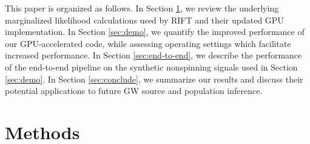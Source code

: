 \documentclass[twocolumn,prd,nofootinbib]{revtex4}
\begin{document}
This paper is organized as follows.
In Section \ref{sec:methods}, we review the underlying marginalized likelihood calculations used by RIFT and  their updated GPU
implementation.  
In Section \ref{sec:demo}, we quantify the improved performance of our  GPU-accelerated code,   while assessing
operating settings which facilitate increased performance.
In Section \ref{sec:end-to-end}, we describe the performance of the end-to-end pipeline on the synthetic nonspinning signals used in
Section \ref{sec:demo}.  
In Section \ref{sec:conclude}, we summarize our results and discuss their potential applications to future GW source and
population inference.


\section{Methods}
\label{sec:methods}
\end{document}

